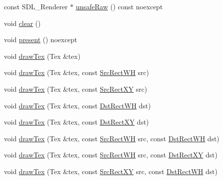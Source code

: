 \begin{DoxyCompactItemize}
const S\+D\+L\+\_\+\+Renderer $\ast$ \mbox{\hyperlink{classrolmodl_1_1blend_mode_1_1_ren_adf79d46836de67415c75f790076d930d}{unsafe\+Raw}} () const noexcept
\item 
void \mbox{\hyperlink{classrolmodl_1_1blend_mode_1_1_ren_a2742970d4e0bfc215e01d8ec525784c1}{clear}} ()
\item 
void \mbox{\hyperlink{classrolmodl_1_1blend_mode_1_1_ren_a95ae9d85d0b4d45dfb447096b1b55332}{present}} () noexcept
\item 
void \mbox{\hyperlink{classrolmodl_1_1blend_mode_1_1_ren_a64cac09144a55a1a83e19e806ac78c90}{draw\+Tex}} (Tex \&tex)
\item 
void \mbox{\hyperlink{classrolmodl_1_1blend_mode_1_1_ren_a1fcaa785cbe4f3e5b28168d3053c22f2}{draw\+Tex}} (Tex \&tex, const \mbox{\hyperlink{structrolmodl_1_1blend_mode_1_1_src_rect_w_h}{Src\+Rect\+WH}} src)
\item 
void \mbox{\hyperlink{classrolmodl_1_1blend_mode_1_1_ren_a62a66efff2ddc8bb075cc05563f344fd}{draw\+Tex}} (Tex \&tex, const \mbox{\hyperlink{structrolmodl_1_1blend_mode_1_1_src_rect_x_y}{Src\+Rect\+XY}} src)
\item 
void \mbox{\hyperlink{classrolmodl_1_1blend_mode_1_1_ren_af39194fb9153972303237ba1ef30969b}{draw\+Tex}} (Tex \&tex, const \mbox{\hyperlink{structrolmodl_1_1blend_mode_1_1_dst_rect_w_h}{Dst\+Rect\+WH}} dst)
\item 
void \mbox{\hyperlink{classrolmodl_1_1blend_mode_1_1_ren_a01f0ba738b77b680857a86f52ddf8d40}{draw\+Tex}} (Tex \&tex, const \mbox{\hyperlink{structrolmodl_1_1blend_mode_1_1_dst_rect_x_y}{Dst\+Rect\+XY}} dst)
\item 
void \mbox{\hyperlink{classrolmodl_1_1blend_mode_1_1_ren_ae04a366c6e65610789172ce3529453e4}{draw\+Tex}} (Tex \&tex, const \mbox{\hyperlink{structrolmodl_1_1blend_mode_1_1_src_rect_w_h}{Src\+Rect\+WH}} src, const \mbox{\hyperlink{structrolmodl_1_1blend_mode_1_1_dst_rect_w_h}{Dst\+Rect\+WH}} dst)
\item 
void \mbox{\hyperlink{classrolmodl_1_1blend_mode_1_1_ren_a47147eb4c0a0ad1b00008651586734a7}{draw\+Tex}} (Tex \&tex, const \mbox{\hyperlink{structrolmodl_1_1blend_mode_1_1_src_rect_w_h}{Src\+Rect\+WH}} src, const \mbox{\hyperlink{structrolmodl_1_1blend_mode_1_1_dst_rect_x_y}{Dst\+Rect\+XY}} dst)
\item 
void \mbox{\hyperlink{classrolmodl_1_1blend_mode_1_1_ren_a55812779fcc4754a232d15615657e154}{draw\+Tex}} (Tex \&tex, const \mbox{\hyperlink{structrolmodl_1_1blend_mode_1_1_src_rect_x_y}{Src\+Rect\+XY}} src, const \mbox{\hyperlink{structrolmodl_1_1blend_mode_1_1_dst_rect_w_h}{Dst\+Rect\+WH}} dst)

\end{DoxyCompactItemize}
